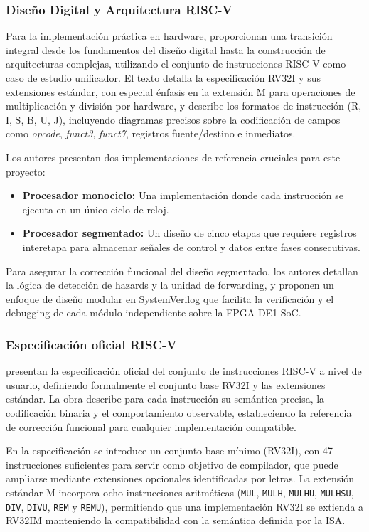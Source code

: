 \subsubsection{Diseño Digital y Arquitectura RISC-V}
Para la implementación práctica en hardware, \textcite{Harris2021Digital}
proporcionan una transición integral desde los fundamentos del diseño digital
hasta la construcción de arquitecturas complejas, utilizando el conjunto de
instrucciones RISC-V como caso de estudio unificador. El texto detalla la
especificación RV32I y sus extensiones estándar, con especial énfasis en la
extensión M para operaciones de multiplicación y división por hardware, y
describe los formatos de instrucción (R, I, S, B, U, J), incluyendo diagramas
precisos sobre la codificación de campos como \textit{opcode}, \textit{funct3},
\textit{funct7}, registros fuente/destino e inmediatos.

Los autores presentan dos implementaciones de referencia cruciales para este
proyecto:
\begin{itemize}
    \item \textbf{Procesador monociclo:} Una implementación donde cada
          instrucción se ejecuta en un único ciclo de reloj.
    \item \textbf{Procesador segmentado:} Un diseño de cinco etapas que
          requiere registros interetapa para almacenar señales de control
          y datos entre fases consecutivas.
\end{itemize}
Para asegurar la corrección funcional del diseño segmentado, los autores
detallan la lógica de detección de hazards y la unidad de forwarding, y
proponen un enfoque de diseño modular en SystemVerilog que facilita la
verificación y el debugging de cada módulo independiente sobre la
FPGA DE1-SoC.\parencite{Harris2021Digital}


\subsubsection{Especificación oficial RISC-V}

\textcite{RISCV2019Manual} presentan la especificación oficial del conjunto de
instrucciones RISC-V a nivel de usuario, definiendo formalmente el conjunto
base RV32I y las extensiones estándar. La obra describe para cada instrucción
su semántica precisa, la codificación binaria y el comportamiento observable,
estableciendo la referencia de corrección funcional para cualquier
implementación compatible.

En la especificación se introduce un conjunto base mínimo (RV32I), con
47 instrucciones suficientes para servir como objetivo de compilador, que puede
ampliarse mediante extensiones opcionales identificadas por letras. La extensión
estándar M incorpora ocho instrucciones aritméticas (\texttt{MUL},
\texttt{MULH}, \texttt{MULHU}, \texttt{MULHSU}, \texttt{DIV}, \texttt{DIVU},
\texttt{REM} y \texttt{REMU}), permitiendo que una implementación RV32I se
extienda a RV32IM manteniendo la compatibilidad con la semántica definida
por la ISA.

